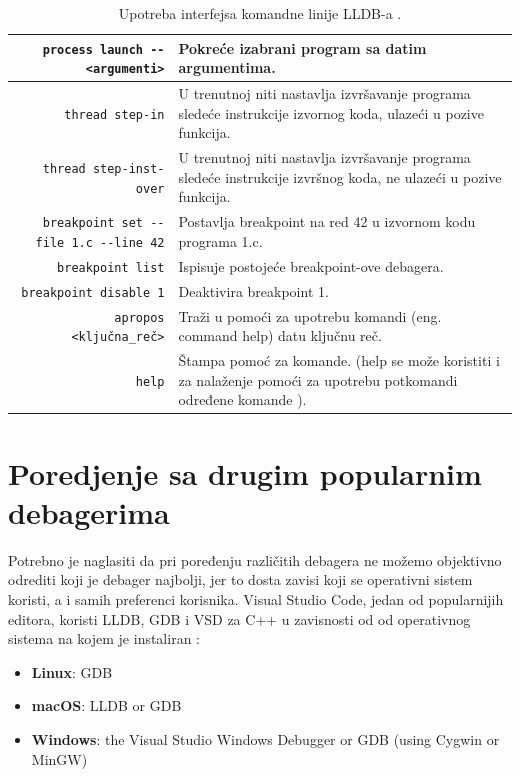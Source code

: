 \documentclass[a4paper]{article}
\begin{document}
\begin{table}[h!]
  \begin{center}
    \caption{Upotreba interfejsa komandne linije LLDB-a \cite{lldb_to_gdb_map}\cite{lldb_tutorial}.}
    \small
    \begin{tabular}{|r|p{5cm}|}
      \hline
      \verb|process launch -- <argumenti>|
      & Pokreće izabrani program sa datim argumentima. \\ \hline
      \verb|thread step-in|
      & U trenutnoj niti nastavlja izvršavanje programa sledeće instrukcije izvornog koda, ulazeći u pozive funkcija.  \\ \hline
      \verb|thread step-inst-over|
      & U trenutnoj niti nastavlja izvršavanje programa sledeće instrukcije izvršnog koda, ne ulazeći u pozive funkcija. \\ \hline
      \verb|breakpoint set --file 1.c --line 42|
      & Postavlja breakpoint na red 42 u izvornom kodu programa 1.c. \\ \hline
      \verb|breakpoint list|
      & Ispisuje postojeće breakpoint-ove debagera. \\ \hline
      \verb|breakpoint disable 1|
      & Deaktivira breakpoint 1. \\ \hline
      \verb|apropos <ključna_reč>|
      & Traži u pomoći za upotrebu komandi (eng. command help) datu ključnu reč. \\ \hline
      \verb|help|
      & Štampa pomoć za komande. (help se može koristiti i za nalaženje pomoći za upotrebu potkomandi određene komande \cite{apple_lldb_comms}). \\ \hline
    \end{tabular}
    \label{tab:tabela3}
  \end{center}
\end{table}

\section{Poredjenje sa drugim popularnim debagerima}
\label{sec:naslovN}

Potrebno je naglasiti da pri poređenju različitih debagera ne možemo objektivno odrediti koji je debager najbolji, jer to dosta zavisi koji se operativni sistem koristi, a i samih preferenci korisnika. Visual Studio Code, jedan od popularnijih editora, koristi LLDB, GDB i VSD za C++ u zavisnosti od od operativnog sistema na kojem je instaliran \cite{vsc_support}:
\begin{itemize}
	\item \textbf{Linux}: GDB
	\item \textbf{macOS}: LLDB or GDB
	\item \textbf{Windows}: the Visual Studio Windows Debugger or GDB (using Cygwin or MinGW)
\end{itemize}
\end{document}
